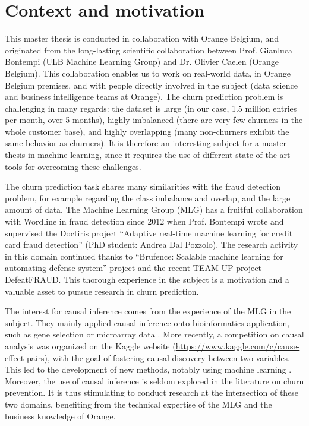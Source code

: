 \section{Context and motivation}

This master thesis is conducted in collaboration with Orange Belgium, and
originated from the long-lasting scientific collaboration between Prof. Gianluca
Bontempi (ULB Machine Learning Group) and Dr. Olivier Caelen (Orange Belgium).
This collaboration enables us to work on real-world data, in Orange Belgium
premises, and with people directly involved in the subject (data science and
business intelligence teams at Orange). The churn prediction problem is
challenging in many regards: the dataset is large (in our case, 1.5 million
entries per month, over 5 months), highly imbalanced (there are very few
churners in the whole customer base), and highly overlapping (many non-churners
exhibit the same behavior as churners). It is therefore an interesting subject
for a master thesis in machine learning, since it requires the use of different
state-of-the-art tools for overcoming these challenges.

The churn prediction task shares many similarities with the fraud detection
problem, for example regarding the class imbalance and overlap, and the large
amount of data. The Machine Learning Group (MLG) has a fruitful collaboration
with Wordline in fraud detection since 2012 when Prof. Bontempi wrote and
supervised the Doctiris project ``Adaptive real-time machine learning for credit
card fraud detection'' (PhD student: Andrea Dal Pozzolo). The research activity
in this domain continued thanks to ``Brufence: Scalable machine learning for
automating defense system'' project and the recent TEAM-UP project DefeatFRAUD.
This thorough experience in the subject is a motivation and a valuable asset to
pursue research in churn prediction.

The interest for causal inference comes from the experience of the MLG in the
subject. They mainly applied causal inference onto bioinformatics application,
such as gene selection \parencite{bontempi2011multiple} or microarray data
\parencite{bontempi2010causal}. More recently, a competition on causal analysis
was organized on the Kaggle website
(\url{https://www.kaggle.com/c/cause-effect-pairs}), with the goal of fostering
causal discovery between two variables. This led to the development of new
methods, notably using machine learning \parencite{bontempi2015dependency}.
Moreover, the use of causal inference is seldom explored in the literature on
churn prevention. It is thus stimulating to conduct research at the intersection
of these two domains, benefiting from the technical expertise of the MLG and
the business knowledge of Orange.

